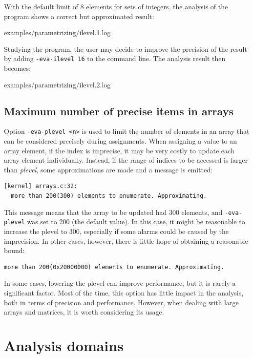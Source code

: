 \documentclass[web]{frama-c-book}
\begin{document}
With the default limit of 8 elements for sets of integers, the
analysis of the program shows a correct but approximated result:


  {examples/parametrizing/ilevel.1.log}

Studying the program, the user may decide to improve the precision of
the result by adding \verb|-eva-ilevel 16| to the command line. The
analysis result then becomes:


  {examples/parametrizing/ilevel.2.log}

\subsection{Maximum number of precise items in arrays}

Option \verb|-eva-plevel <n>| is used to limit the number of elements
in an array that can be considered precisely during assignments.
When assigning a value to an array element, if the index is imprecise,
it may be very costly to update each array element individually.
Instead, if the range of indices to be accessed is larger than {\em plevel},
some approximations are made and a message is emitted:

\begin{lstlisting}
[kernel] arrays.c:32:
  more than 200(300) elements to enumerate. Approximating.
\end{lstlisting}

This message means that the array to be updated had 300 elements, and
\verb|-eva-plevel| was set to 200 (the default value). In this case, it
might be reasonable to increase the plevel to 300, especially if some alarms
could be caused by the imprecision. In other cases, however, there is little
hope of obtaining a reasonable bound:

\begin{lstlisting}
more than 200(0x20000000) elements to enumerate. Approximating.
\end{lstlisting}

In some cases, lowering the plevel can improve performance, but it is rarely
a significant factor. Most of the time, this option has little impact in the
analysis, both in terms of precision and performance. However, when dealing
with large arrays and matrices, it is worth considering its usage.


\section{Analysis domains}
\label{sec:eva}
\end{document}
